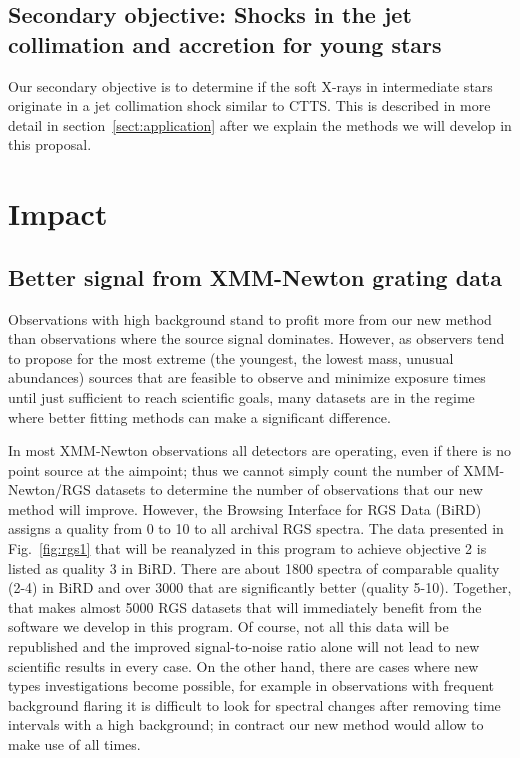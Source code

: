 \documentclass[fleqn,12pt,onecolumn]{SelfArx} %
\begin{document}
\subsection{Secondary objective: Shocks in the jet collimation and accretion for young stars}
Our secondary objective is to determine if the soft X-rays in intermediate stars originate in a jet collimation shock similar to CTTS. This is described in more detail in section~\ref{sect:application} after we explain the methods we will develop in this proposal.

\newpage

\section{Impact}

\subsection{Better signal from XMM-Newton grating data}
Observations with high background stand to profit more from our new method than observations where the source signal dominates. However, as observers tend to propose for the most extreme (the youngest, the lowest mass, unusual abundances) sources that are feasible to observe and minimize exposure times until just sufficient to reach scientific goals, many datasets are in the regime where better fitting methods can make a significant difference.

In most XMM-Newton observations  all detectors are operating, even if there is no point source at the aimpoint; thus we cannot simply count the number of XMM-Newton/RGS datasets to determine the number of observations that our new method will improve. However, the Browsing Interface for RGS Data (BiRD) assigns a quality from 0 to 10 to all archival RGS spectra. %
The data presented in Fig.~\ref{fig:rgs1} that will be reanalyzed in this program to achieve objective 2 is listed as quality 3 in BiRD. There are about 1800 spectra of comparable quality (2-4) in BiRD and over 3000 that are significantly better (quality 5-10). Together, that makes almost 5000 RGS datasets that will immediately benefit from the software we develop in this program. Of course, not all this data will be republished and the improved signal-to-noise ratio alone will not lead to new scientific results in every case. On the other hand, there are cases where new types investigations become possible, for example in observations with frequent background flaring it is difficult to look for spectral changes after removing time intervals with a high background; in contract our new method would allow to make use of all times.
\end{document}
